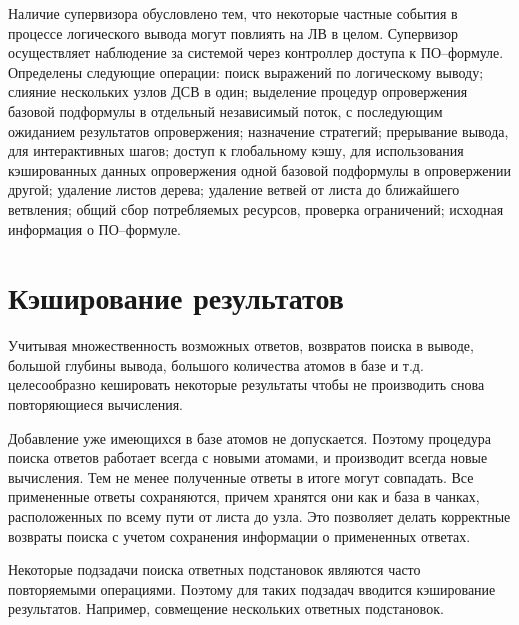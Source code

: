 Наличие супервизора обусловлено тем, что некоторые частные события в процессе логического вывода могут повлиять на ЛВ в целом. Супервизор осуществляет наблюдение за системой через контроллер доступа к ПО--формуле. Определены следующие операции: поиск выражений по логическому выводу; слияние нескольких узлов ДСВ в один; выделение процедур опровержения базовой подформулы в отдельный независимый поток, с последующим ожиданием результатов опровержения; назначение стратегий; прерывание вывода, для интерактивных шагов; доступ к глобальному кэшу, для использования кэшированных данных опровержения одной базовой подформулы в опровержении другой; удаление листов дерева; удаление ветвей от листа до ближайшего ветвления; общий сбор потребляемых ресурсов, проверка ограничений; исходная информация о ПО--формуле.


\section{Кэширование результатов}
Учитывая множественность возможных ответов, возвратов поиска в выводе, большой глубины вывода, большого количества атомов в базе и т.д. целесообразно кешировать некоторые результаты чтобы не производить снова повторяющиеся вычисления.

Добавление уже имеющихся в базе атомов не допускается. Поэтому процедура поиска ответов работает всегда с новыми атомами, и производит всегда новые вычисления. Тем не менее полученные ответы в итоге могут совпадать. Все примененные ответы сохраняются, причем хранятся они как и база в чанках, расположенных по всему пути от листа до узла. Это позволяет делать корректные возвраты поиска с учетом сохранения информации о примененных ответах.

Некоторые подзадачи поиска ответных подстановок являются часто повторяемыми операциями. Поэтому для таких подзадач вводится кэширование результатов. Например, совмещение нескольких ответных подстановок.




